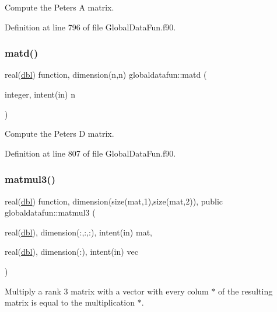Compute the Peters A matrix. 



Definition at line 796 of file Global\+Data\+Fun.\+f90.

\mbox{\label{namespaceglobaldatafun_a5290afbf1d3da671a523a4727bdc7218}} 
\subsubsection{\texorpdfstring{matd()}{matd()}}
{\footnotesize\ttfamily real(\hyperlink{namespaceglobaldatafun_a5008801201dd34f2af8eae07756befb4}{dbl}) function, dimension(n,n) globaldatafun\+::matd (\begin{DoxyParamCaption}\item[{integer, intent(in)}]{n }\end{DoxyParamCaption})\hspace{0.3cm}{\ttfamily [private]}}



Compute the Peters D matrix. 



Definition at line 807 of file Global\+Data\+Fun.\+f90.

\mbox{\label{namespaceglobaldatafun_a562042b12250dbd7e3ef3a24d9f93a53}} 
\subsubsection{\texorpdfstring{matmul3()}{matmul3()}}
{\footnotesize\ttfamily real(\hyperlink{namespaceglobaldatafun_a5008801201dd34f2af8eae07756befb4}{dbl}) function, dimension(size(mat,1),size(mat,2)), public globaldatafun\+::matmul3 (\begin{DoxyParamCaption}\item[{real(\hyperlink{namespaceglobaldatafun_a5008801201dd34f2af8eae07756befb4}{dbl}), dimension(\+:,\+:,\+:), intent(in)}]{mat,  }\item[{real(\hyperlink{namespaceglobaldatafun_a5008801201dd34f2af8eae07756befb4}{dbl}), dimension(\+:), intent(in)}]{vec }\end{DoxyParamCaption})}



Multiply a rank 3 matrix with a vector with every colum $\ast$ of the resulting matrix is equal to the multiplication $\ast$. 



